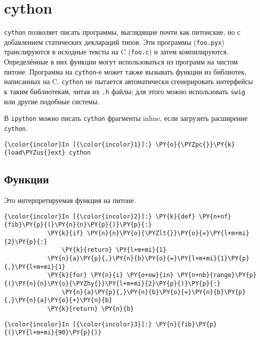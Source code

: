\section{cython}
\label{cython}

\texttt{cython} позволяет писать программы, выглядящие почти как
питонские, но с добавлением статических деклараций типов. Эти программы
(\texttt{foo.pyx}) транслируются в исходные тексты на C (\texttt{foo.c})
и затем компилируются. Определённые в них функции могут использоваться
из программ на чистом питоне. Программа на \texttt{cython}-е может также
вызывать функции из библиотек, написанных на C. \texttt{cython} не
пытается автоматически сгенерировать интерфейсы к таким библиотекам,
читая их \texttt{.h} файлы; для этого можно использовать \texttt{swig}
или другие подобные системы.

В \texttt{ipython} можно писать \texttt{cython} фрагменты inline, если
загрузить расширение \texttt{cython}.

    \begin{Verbatim}[commandchars=\\\{\}]
{\color{incolor}In [{\color{incolor}1}]:} \PY{o}{\PYZpc{}}\PY{k}{load\PYZus{}ext} cython
\end{Verbatim}

\subsection{Функции}
\label{cython2}

Это интерпретируемая функция на питоне.

    \begin{Verbatim}[commandchars=\\\{\}]
{\color{incolor}In [{\color{incolor}2}]:} \PY{k}{def} \PY{n+nf}{fib}\PY{p}{(}\PY{n}{n}\PY{p}{)}\PY{p}{:}
            \PY{k}{if} \PY{n}{n}\PY{o}{\PYZlt{}}\PY{o}{=}\PY{l+m+mi}{2}\PY{p}{:}
                \PY{k}{return} \PY{l+m+mi}{1}
            \PY{n}{a}\PY{p}{,}\PY{n}{b}\PY{o}{=}\PY{l+m+mi}{1}\PY{p}{,}\PY{l+m+mi}{1}
            \PY{k}{for} \PY{n}{i} \PY{o+ow}{in} \PY{n+nb}{range}\PY{p}{(}\PY{n}{n}\PY{o}{\PYZhy{}}\PY{l+m+mi}{2}\PY{p}{)}\PY{p}{:}
                \PY{n}{a}\PY{p}{,}\PY{n}{b}\PY{o}{=}\PY{n}{b}\PY{p}{,}\PY{n}{a}\PY{o}{+}\PY{n}{b}
            \PY{k}{return} \PY{n}{b}
\end{Verbatim}

    \begin{Verbatim}[commandchars=\\\{\}]
{\color{incolor}In [{\color{incolor}3}]:} \PY{n}{fib}\PY{p}{(}\PY{l+m+mi}{90}\PY{p}{)}
\end{Verbatim}

